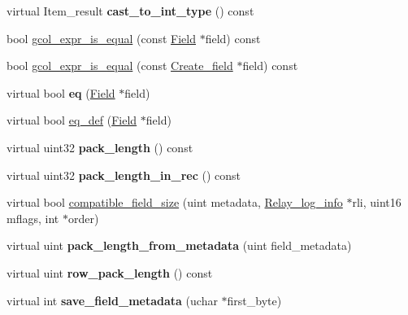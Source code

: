 \begin{DoxyCompactItemize}
\mbox{\label{classField_a29bb2c6d7f27280d78063afcce71e7d7}} 
virtual Item\+\_\+result {\bfseries cast\+\_\+to\+\_\+int\+\_\+type} () const
\item 
bool \mbox{\hyperlink{classField_a8b534abe7f803ec84e85835387a9add6}{gcol\+\_\+expr\+\_\+is\+\_\+equal}} (const \mbox{\hyperlink{classField}{Field}} $\ast$field) const
\item 
bool \mbox{\hyperlink{classField_a4dab42898fdc04b1e2c87bc59cf9c049}{gcol\+\_\+expr\+\_\+is\+\_\+equal}} (const \mbox{\hyperlink{classCreate__field}{Create\+\_\+field}} $\ast$field) const
\item 
\mbox{\label{classField_a51e7a3d2cbea259aa91deaf2eaad6449}} 
virtual bool {\bfseries eq} (\mbox{\hyperlink{classField}{Field}} $\ast$field)
\item 
virtual bool \mbox{\hyperlink{classField_a7c9a51f0cc4e8c580838eed3a4f8e846}{eq\+\_\+def}} (\mbox{\hyperlink{classField}{Field}} $\ast$field)
\item 
\mbox{\label{classField_a423ef14c52545ac3f5ca777fad746cb3}} 
virtual uint32 {\bfseries pack\+\_\+length} () const
\item 
\mbox{\label{classField_a15b729a0a3ec5edb505b12ea78c0b918}} 
virtual uint32 {\bfseries pack\+\_\+length\+\_\+in\+\_\+rec} () const
\item 
virtual bool \mbox{\hyperlink{classField_ab603b7f21a9116358e400dd7282cee50}{compatible\+\_\+field\+\_\+size}} (uint metadata, \mbox{\hyperlink{classRelay__log__info}{Relay\+\_\+log\+\_\+info}} $\ast$rli, uint16 mflags, int $\ast$order)
\item 
\mbox{\label{classField_a4b264fe3befd78c387363320436d7888}} 
virtual uint {\bfseries pack\+\_\+length\+\_\+from\+\_\+metadata} (uint field\+\_\+metadata)
\item 
\mbox{\label{classField_af105bc882870af8380a2d0dadf2204cb}} 
virtual uint {\bfseries row\+\_\+pack\+\_\+length} () const
\item 
\mbox{\label{classField_a74244f644bfa255f4fd6201c3a0f9a5a}} 
virtual int {\bfseries save\+\_\+field\+\_\+metadata} (uchar $\ast$first\+\_\+byte)
\item 
\mbox{\label{classField_ab8efded10a03ff183ea12a228e60c6c8}} 

\end{DoxyCompactItemize}
